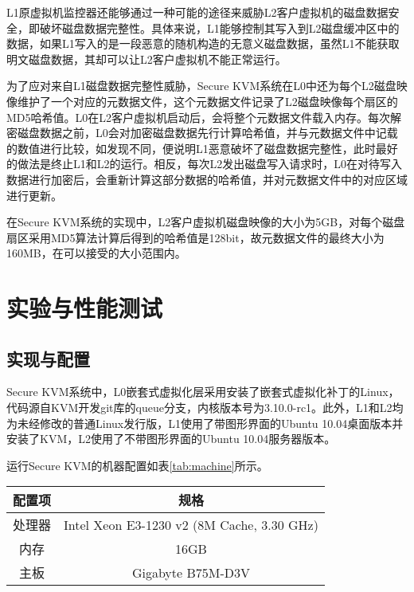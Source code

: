 L1原虚拟机监控器还能够通过一种可能的途径来威胁L2客户虚拟机的磁盘数据安全，即破坏磁盘数据完整性。具体来说，L1能够控制其写入到L2磁盘缓冲区中的数据，如果L1写入的是一段恶意的随机构造的无意义磁盘数据，虽然L1不能获取明文磁盘数据，其却可以让L2客户虚拟机不能正常运行。

为了应对来自L1磁盘数据完整性威胁，Secure KVM系统在L0中还为每个L2磁盘映像维护了一个对应的元数据文件，这个元数据文件记录了L2磁盘映像每个扇区的MD5哈希值。L0在L2客户虚拟机启动后，会将整个元数据文件载入内存。每次解密磁盘数据之前，L0会对加密磁盘数据先行计算哈希值，并与元数据文件中记载的数值进行比较，如发现不同，便说明L1恶意破坏了磁盘数据完整性，此时最好的做法是终止L1和L2的运行。相反，每次L2发出磁盘写入请求时，L0在对待写入数据进行加密后，会重新计算这部分数据的哈希值，并对元数据文件中的对应区域进行更新。

在Secure KVM系统的实现中，L2客户虚拟机磁盘映像的大小为5GB，对每个磁盘扇区采用MD5算法计算后得到的哈希值是128bit，故元数据文件的最终大小为160MB，在可以接受的大小范围内。

\section{实验与性能测试}

\subsection{实现与配置}

Secure KVM系统中，L0嵌套式虚拟化层采用安装了嵌套式虚拟化补丁的Linux，代码源自KVM开发git库的queue分支，内核版本号为3.10.0-rc1。此外，L1和L2均为未经修改的普通Linux发行版，L1使用了带图形界面的Ubuntu 10.04桌面版本并安装了KVM，L2使用了不带图形界面的Ubuntu 10.04服务器版本。

运行Secure KVM的机器配置如表\ref{tab:machine}所示。

\begin{table}[htpb]
\centering
\begin{tabular}{cc}
\toprule
配置项	& 规格\\
\midrule
处理器	& Intel Xeon E3-1230 v2 (8M Cache, 3.30 GHz)\\
内存	& 16GB\\
主板	& Gigabyte B75M-D3V\\
\bottomrule
\end{tabular}
\end{table}

